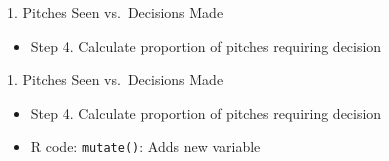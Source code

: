 \begin{frame}[fragile]{1. Pitches Seen vs.~Decisions Made}

\begin{itemize}
\tightlist
\item
  Step 4. Calculate proportion of pitches requiring decision
\end{itemize}

\footnotesize

\begin{Shaded}
\end{Shaded}

\end{frame}

\begin{frame}[fragile]{1. Pitches Seen vs.~Decisions Made}

\begin{itemize}
\tightlist
\item
  Step 4. Calculate proportion of pitches requiring decision
\item
  R code: \texttt{mutate()}: Adds new variable
\end{itemize}

\footnotesize

\begin{Shaded}
\end{Shaded}

\end{frame}

